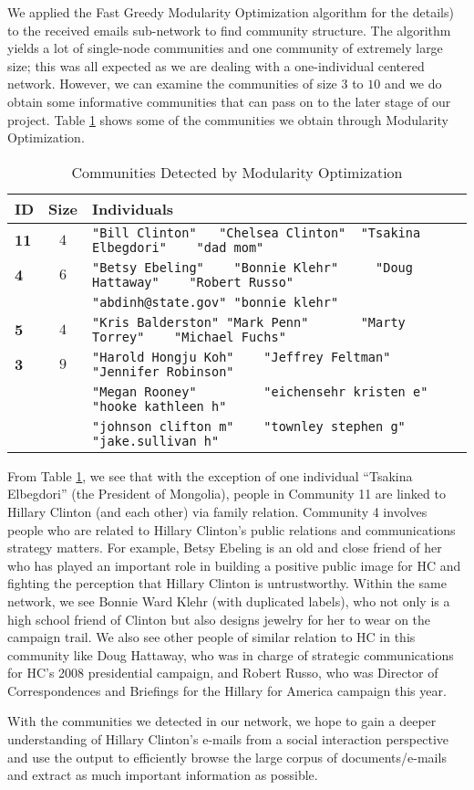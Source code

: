 We applied the Fast Greedy Modularity Optimization algorithm \cite{greedy_mod} for the details) to the received emails sub-network to find community structure. 
The algorithm yields a lot of single-node communities and one community of extremely large size; this was all expected as we are dealing with a one-individual centered network. 
However, we can examine the communities of size $3$ to $10$ and we do obtain some informative communities that can pass on to the later stage of our project. 
Table \ref{tab:greedy} shows some of the communities we obtain through Modularity Optimization.
\begin{table}
\centering
\begin{tabular}{|l |c| l|}\hline
{\bf ID} & \bf Size & \bf Individuals \\ \hline \hline
\bf 11 & $4$ & \verb+"Bill Clinton"   "Chelsea Clinton"  "Tsakina Elbegdori"    "dad mom"+ \\ \hline
\bf 4 & $6$ & \verb+"Betsy Ebeling"    "Bonnie Klehr"     "Doug Hattaway"    "Robert Russo"+\\
&& \verb+"abdinh@state.gov" "bonnie klehr"+\\ \hline
{\bf 5} & $4$ &\verb+"Kris Balderston" "Mark Penn"       "Marty Torrey"    "Michael Fuchs"+\\ \hline
{\bf 3} & $9$ & \verb+"Harold Hongju Koh"    "Jeffrey Feltman"      "Jennifer Robinson"+\\
&& \verb+"Megan Rooney"         "eichensehr kristen e" "hooke kathleen h"+\\
&& \verb+"johnson clifton m"    "townley stephen g"    "jake.sullivan h"+ \\
\hline 
\end{tabular}
\caption{Communities Detected by Modularity Optimization}
\label{tab:greedy}
\end{table}

From Table \ref{tab:greedy}, we see that with the exception of one individual ``Tsakina Elbegdori'' (the President of Mongolia), people in Community 11 are linked to Hillary Clinton (and each other) via family relation. 
Community 4 involves people who are related to Hillary Clinton's public relations and communications strategy matters. 
For example, Betsy Ebeling is an old and close friend of her who has played an important role in building a positive public image for HC and fighting the perception that Hillary Clinton is untrustworthy. 
Within the same network, we see Bonnie Ward Klehr (with duplicated labels), who not only is a high school friend of Clinton but also designs jewelry for her to wear on the campaign trail. 
We also see other people of similar relation to HC in this community like Doug Hattaway, who was in charge of strategic communications for HC's 2008 presidential campaign, and Robert Russo, who was Director of Correspondences and Briefings for the Hillary for America campaign this year. 

With the communities we detected in our network, we hope to gain a deeper understanding of Hillary Clinton's e-mails from a social interaction perspective and use the output to efficiently browse the large corpus of documents/e-mails and extract as much important information as possible.
